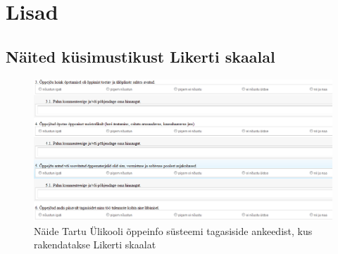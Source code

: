 \documentclass[a4paper,12pt,oneside]{article}
\numberwithin{equation}{section}
\theoremstyle{definition}
\begin{document}
\pagebreak
{}


\pagebreak

\section*{Lisad}

\begin{subappendices}
\subsection{Näited küsimustikust Likerti skaalal}


\begin{figure}[H]
\centering
\includegraphics[width=1\textwidth]{ois_tagasiside_toodeldud.png}
\caption{Näide Tartu \"Ulikooli õppeinfo s\"usteemi tagasiside ankeedist, kus rakendatakse Likerti skaalat \cite{UT}}
\label{likert1}
\end{figure}


\end{subappendices}
\end{document}

